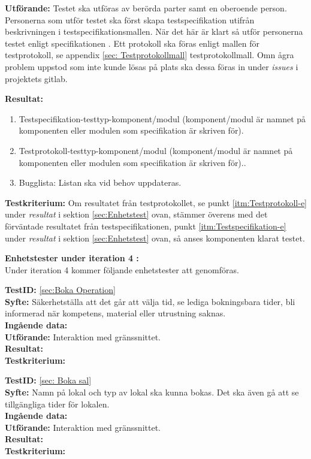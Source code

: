 \documentclass[a4paper,10pt, twoside]{article}
\begin{document}
  \textbf{Utförande:} Testet ska utföras av berörda parter samt en oberoende
   person. Personerna som utför testet ska först skapa testspecifikation utifrån beskrivningen i testspecifikationsmallen. När det här är klart så utför
   personerna testet enligt specifikationen \cite{kravspec}. Ett protokoll ska föras enligt mallen för testprotokoll, se appendix \ref{sec:
   Testprotokollmall} testprotokollmall. Omn ågra problem uppstod som inte kunde lösas på plats ska dessa föras in under \emph{issues} i projektets gitlab.

  \textbf{Resultat:}
    \begin{enumerate}
      \item \label{itm:Testspecifikation-e} Testspecifikation-testtyp-komponent/modul (komponent/modul är namnet på komponenten eller modulen som 				   specifikation är skriven för).
      \item \label{itm:Testprotokoll-e} Testprotokoll-testtyp-komponent/modul (komponent/modul är namnet på komponenten eller modulen som specifikation
       är skriven för)..
      \item Bugglista: Listan ska vid behov uppdateras.
    \end{enumerate}

  \textbf{Testkriterium:} Om resultatet från testprotokollet, se punkt \ref{itm:Testprotokoll-e} under \emph{resultat} i sektion \ref{sec:Enhetstest}
   ovan, stämmer överens med det förväntade resultatet från testspecifikationen, punkt \ref{itm:Testspecifikation-e} under \emph{resultat} i sektion
  \ref{sec:Enhetstest} ovan, så anses komponenten klarat testet.

  \textbf{Enhetstester under iteration 4 :}
  \\  Under iteration 4 kommer följande enhetstester att genomföras.

  \textbf{TestID:} \ref{sec:Boka Operation}
  \\ \textbf{Syfte:} Säkerhetställa att det går att välja tid, se lediga bokningsbara tider, bli informerad när kompetens, material eller utrustning saknas.
  \\ \textbf{Ingående data:}
  \\ \textbf{Utförande:} Interaktion med gränssnittet.
  \\ \textbf{Resultat:}
  \\ \textbf{Testkriterium:}

  \textbf{TestID:} \ref{sec: Boka sal}
  \\ \textbf{Syfte:} Namn på lokal och typ av lokal ska kunna bokas. Det ska även gå att se tillgängliga tider för lokalen.
  \\ \textbf{Ingående data:}
  \\ \textbf{Utförande:} Interaktion med gränssnittet.
  \\ \textbf{Resultat:}
  \\ \textbf{Testkriterium:}
\end{document}
